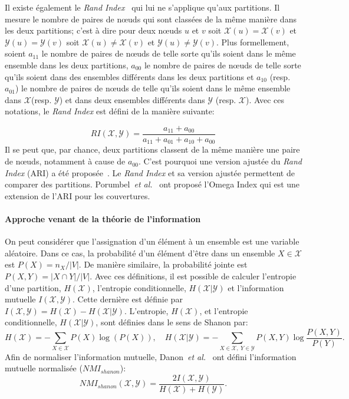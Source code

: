 Il existe également le \emph{Rand Index}~\cite{Rand1971} qui lui ne s'applique qu'aux partitions.
Il mesure le nombre de paires de n\oe{}uds qui sont classées de la même manière dans les deux partitions; c'est à dire pour deux n\oe{}uds $u$ et $v$ soit $\mathcal{X}(u)=\mathcal{X}(v)$ et $\mathcal{Y}(u)=\mathcal{Y}(v)$ soit $\mathcal{X}(u)\neq \mathcal{X}(v)$ et $\mathcal{Y}(u)\neq \mathcal{Y}(v)$.
Plus formellement, soient $a_{11}$ le nombre de paires de n\oe{}uds de telle sorte qu'ils soient dans le même ensemble dans les deux partitions, $a_{00}$ le nombre de paires de n\oe{}uds de telle sorte qu'ils soient dans des ensembles différents dans les deux partitions et $a_{10}$ (resp. $a_{01}$) le nombre de paires de n\oe{}uds de telle qu'ils soient dans le même ensemble dans $\mathcal{X}$(resp. $\mathcal{Y}$) et dans deux ensembles différents dans $\mathcal{Y}$ (resp. $\mathcal{X}$).
Avec ces notations, le \emph{Rand Index} est défini de la manière suivante:

\begin{equation}
RI(\mathcal{X},\mathcal{Y}) = \dfrac{a_{11} + a_{00}}{a_{11}+a_{01}+a_{10}+ a_{00}}
\end{equation}
Il se peut que, par chance, deux partitions classent de la même manière une paire de n\oe{}uds, notamment à cause de $a_{00}$.
C'est pourquoi une version ajustée du \emph{Rand Index} (ARI) a été proposée~\cite{Hubert1985}.
Le \emph{Rand Index} et sa version ajustée permettent de comparer des partitions.
Porumbel~\emph{et al.}~\cite{Porumbel2011} ont proposé l'Omega Index qui est une extension de l'ARI pour les couvertures.

\paragraph{Approche venant de la théorie de l'information}
On peut considérer que l'assignation d'un élément à un ensemble est une variable aléatoire.
Dans ce cas, la probabilité d'un élément d'être dans un ensemble $X \in \mathcal{X}$ est $P(X)= n_X/|V|$.
De manière similaire, la probabilité jointe est $P(X,Y) = |X \cap Y|/|V|$.
Avec ces définitions, il est possible de calculer l'entropie d'une partition, $H(\mathcal{X})$, l'entropie conditionnelle, $H(\mathcal{X}|\mathcal{Y})$ et l'information mutuelle $I(\mathcal{X},\mathcal{Y})$.
Cette dernière est définie par $I(\mathcal{X}, \mathcal{Y}) = H(\mathcal{X}) - H(\mathcal{X}|\mathcal{Y})$.
L'entropie, $H(\mathcal{X})$, et l'entropie conditionnelle, $H(\mathcal{X}|\mathcal{Y})$, sont définies dans le sens de Shanon par: 
\begin{equation}
H(\mathcal{X}) = - \sum_{X \in \mathcal{X}} P(X)\log(P(X)),\quad H(\mathcal{X}|\mathcal{Y}) = -\sum_{X \in \mathcal{X},\ Y \in \mathcal{Y}} P(X, Y) \log \dfrac{P(X,Y)}{P(Y)}.
\end{equation}
Afin de normaliser l'information mutuelle, Danon~\emph{et al.}~\cite{Danon2005a} ont défini l'information mutuelle normalisée ($NMI_{shanon}$):
\begin{equation}
 NMI_{shanon}(\mathcal{X},\mathcal{Y}) = \dfrac{2I(\mathcal{X},\mathcal{Y})}{H(\mathcal{X})+H(\mathcal{Y})}.
\end{equation}

